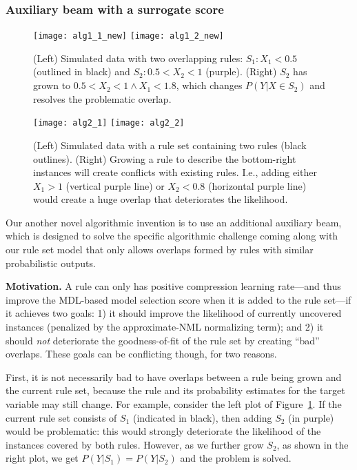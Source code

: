 \subsubsection{Auxiliary beam with a surrogate score} \label{subsec:auxiliary_beam}
\begin{figure}[ht]
    \centering
    \texttt{[image: alg1\_1\_new]}
    \texttt{[image: alg1\_2\_new]}
    \caption{(Left) Simulated data with two overlapping rules: $S_1: X_1 < 0.5$ (outlined in black) and $S_2: 0.5 < X_2 < 1$ (purple). (Right) $S_2$ has  grown to $0.5 < X_2 < 1 \land X_1 < 1.8$, which changes $P(Y|X \in S_2)$ and  resolves the problematic overlap.
    }
    \label{fig:alg1}
\end{figure}
\begin{figure}[ht]
    \centering
    \texttt{[image: alg2\_1]}
    \texttt{[image: alg2\_2]}
    \caption{(Left) Simulated data with a rule set containing two rules (black outlines). (Right) Growing a rule to describe the bottom-right instances will create conflicts with existing rules. I.e., adding either $X_1 > 1$ (vertical purple line) or $X_2 < 0.8$ (horizontal purple line) would create a huge overlap that deteriorates the likelihood.}
    \label{fig:alg2}
\end{figure}
Our another novel algorithmic invention is to use an additional auxiliary beam, which is designed to solve the specific algorithmic challenge coming along with our rule set model that only allows overlaps formed by rules with similar probabilistic outputs. 

\noindent \textbf{Motivation.} A rule can only has positive compression learning rate---and thus improve the MDL-based model selection score when it is added to the rule set---if it achieves two goals: 1) it should improve the likelihood of currently uncovered instances (penalized by the approximate-NML normalizing term); and 2) it should \emph{not} deteriorate the goodness-of-fit of the rule set by creating ``bad'' overlaps. These goals can be conflicting though, for two reasons.
   
First, it is not necessarily bad to have overlaps between a rule being grown and the current rule set, because the rule and its probability estimates for the target variable may still change. For example, consider the left plot of Figure~\ref{fig:alg1}. If the current rule set consists of $S_1$ (indicated in black), then adding $S_2$ (in purple) would be problematic: this would strongly deteriorate the likelihood of the instances covered by both rules. However, as we further grow $S_2$, as shown in the right plot, we get $P(Y|S_1) = P(Y|S_2)$ and the problem is solved.

